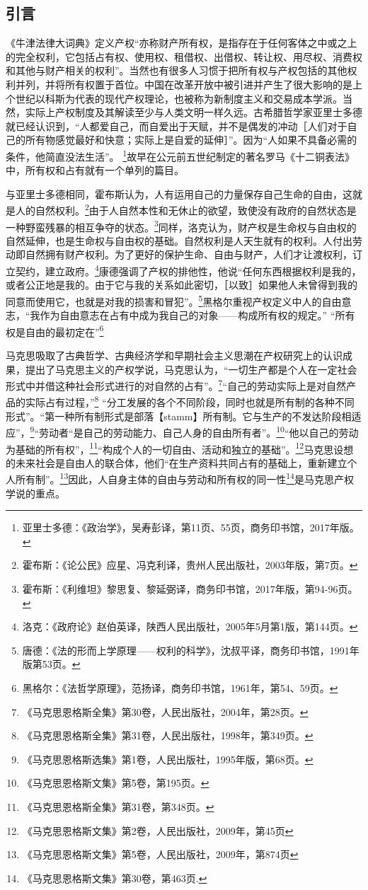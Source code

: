 \documentclass[lang=cn,12pt,a4paper]{elegantpaper}
\begin{document}
\subsection{引言}

《牛津法律大词典》定义产权“亦称财产所有权，是指存在于任何客体之中或之上的完全权利，它包括占有权、使用权、租借权、出借权、转让权、用尽权、消费权和其他与财产相关的权利”。当然也有很多人习惯于把所有权与产权包括的其他权利并列，并将所有权置于首位。中国在改革开放中被引进并产生了很大影响的是上个世纪以科斯为代表的现代产权理论，也被称为新制度主义和交易成本学派。当然，实际上产权制度及其解读至少与人类文明一样久远。古希腊哲学家亚里士多德就已经认识到，“人都爱自己，而自爱出于天赋，并不是偶发的冲动［人们对于自己的所有物感觉最好和快意；实际上是自爱的延伸］”。因为“人如果不具备必需的条件，他简直没法生活”。 \footnote{亚里士多德：《政治学》，吴寿彭译，第11页、55页，商务印书馆，2017年版。}故早在公元前五世纪制定的著名罗马《十二铜表法》中，所有权和占有就有一个单列的篇目。

与亚里士多德相同，霍布斯认为，人有运用自己的力量保存自己生命的自由，这就是人的自然权利。\footnote{霍布斯：《论公民》应星、冯克利译，贵州人民出版社，2003年版，第7页。}由于人自然本性和无休止的欲望，致使没有政府的自然状态是一种野蛮残暴的相互争夺的状态。\footnote{霍布斯：《利维坦》黎思复、黎延弼译，商务印书馆，2017年版，第94-96页。}同样，洛克认为，财产权是生命权与自由权的自然延伸，也是生命权与自由权的基础。自然权利是人天生就有的权利。人付出劳动即自然拥有财产权利。为了更好的保护生命、自由与财产，人们才让渡权利，订立契约，建立政府。\footnote{洛克：《政府论》赵伯英译，陕西人民出版社，2005年5月第1版，第144页。}康德强调了产权的排他性，他说``任何东西根据权利是我的，或者公正地是我的。由于它与我的关系如此密切，［以致］如果他人未曾得到我的同意而使用它，也就是对我的损害和冒犯''。\footnote{唐德：《法的形而上学原理------权利的科学》，沈叔平译，商务印书馆，1991年版第53页。}黑格尔重视产权定义中人的自由意志，``我作为自由意志在占有中成为我自己的对象——构成所有权的规定。'' “所有权是自由的最初定在”\footnote{黑格尔：《法哲学原理》，范扬译，商务印书馆，1961年，第54、59页。}

马克思吸取了古典哲学、古典经济学和早期社会主义思潮在产权研究上的认识成果，提出了马克思主义的产权学说，马克思认为，``一切生产都是个人在一定社会形式中并借这种社会形式进行的对自然的占有''。\footnote{《马克思恩格斯全集》第30卷，人民出版社，2004年，第28页。}``自己的劳动实际上是对自然产品的实际占有过程，''\footnote{《马克思恩格斯全集》第31卷，人民出版社，1998年，第349页。}
``分工发展的各个不同阶段，同时也就是所有制的各种不同形式''。``第一种所有制形式是部落【stamm】所有制。它与生产的不发达阶段相适应''，\footnote{《马克思恩格斯选集》第1卷，人民出版社，1995年版，第68页。}``劳动者``是自己的劳动能力、自己人身的自由所有者''。\footnote{《马克思恩格斯文集》第5卷，第195页。}``他以自己的劳动为基础的所有权''，\footnote{《马克思恩格斯全集》第31卷，第348页。}``构成个人的一切自由、活动和独立的基础''。\footnote{《马克思恩格斯文集》第2卷，人民出版社，2009年，第45页}马克思设想的未来社会是自由人的联合体，他们``在生产资料共同占有的基础上，重新建立个人所有制''。\footnote{《马克思恩格斯文集》第5卷，人民出版社，2009年，第874页}因此，人自身主体的自由与劳动和所有权的同一性\footnote{《马克思恩格斯文集》第30卷，第463页.}是马克思产权学说的重点。
\end{document}
